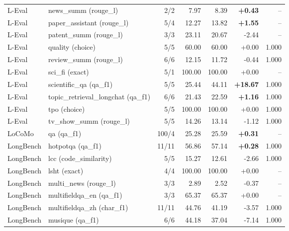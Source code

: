 \begin{longtable}{lp{3.1cm}rrrrr}
L-Eval & \raggedright news\_\allowbreak summ {\tiny (rouge\_l)} & 2/2 & 7.97 & 8.39 & \textbf{+0.43} & -- \\
L-Eval & \raggedright paper\_\allowbreak assistant {\tiny (rouge\_l)} & 5/4 & 12.27 & 13.82 & \textbf{+1.55} & -- \\
L-Eval & \raggedright patent\_\allowbreak summ {\tiny (rouge\_l)} & 3/3 & 23.11 & 20.67 & -2.44 & -- \\
L-Eval & \raggedright quality {\tiny (choice)} & 5/5 & 60.00 & 60.00 & +0.00 & 1.000 \\
L-Eval & \raggedright review\_\allowbreak summ {\tiny (rouge\_l)} & 6/6 & 12.15 & 11.72 & -0.44 & 1.000 \\
L-Eval & \raggedright sci\_\allowbreak fi {\tiny (exact)} & 5/1 & 100.00 & 100.00 & +0.00 & -- \\
L-Eval & \raggedright scientific\_\allowbreak qa {\tiny (qa\_f1)} & 5/5 & 25.44 & 44.11 & \textbf{+18.67} & 1.000 \\
L-Eval & \raggedright topic\_\allowbreak retrieval\_\allowbreak longchat {\tiny (qa\_f1)} & 6/6 & 21.43 & 22.59 & \textbf{+1.16} & 1.000 \\
L-Eval & \raggedright tpo {\tiny (choice)} & 5/5 & 100.00 & 100.00 & +0.00 & 1.000 \\
L-Eval & \raggedright tv\_\allowbreak show\_\allowbreak summ {\tiny (rouge\_l)} & 5/5 & 14.26 & 13.14 & -1.12 & 1.000 \\
LoCoMo & \raggedright qa {\tiny (qa\_f1)} & 100/4 & 25.28 & 25.59 & \textbf{+0.31} & -- \\
LongBench & \raggedright hotpotqa {\tiny (qa\_f1)} & 11/11 & 56.86 & 57.14 & \textbf{+0.28} & 1.000 \\
LongBench & \raggedright lcc {\tiny (code\_similarity)} & 5/5 & 15.27 & 12.61 & -2.66 & 1.000 \\
LongBench & \raggedright lsht {\tiny (exact)} & 4/4 & 100.00 & 100.00 & +0.00 & -- \\
LongBench & \raggedright multi\_\allowbreak news {\tiny (rouge\_l)} & 3/3 & 2.89 & 2.52 & -0.37 & -- \\
LongBench & \raggedright multifieldqa\_\allowbreak en {\tiny (qa\_f1)} & 3/3 & 65.37 & 65.37 & +0.00 & -- \\
LongBench & \raggedright multifieldqa\_\allowbreak zh {\tiny (char\_f1)} & 11/11 & 44.76 & 41.19 & -3.57 & 1.000 \\
LongBench & \raggedright musique {\tiny (qa\_f1)} & 6/6 & 44.18 & 37.04 & -7.14 & 1.000 \\

\end{longtable}
